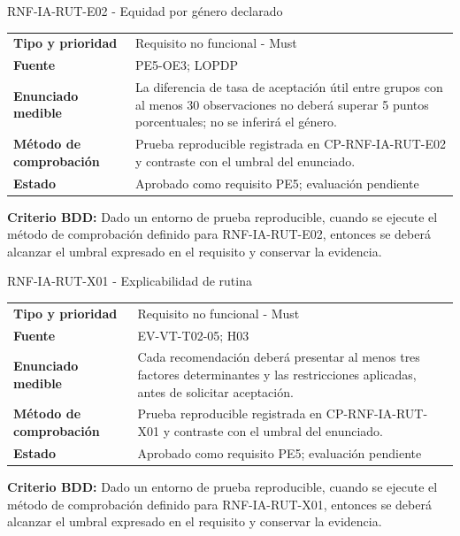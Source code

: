 \documentclass[11pt,a4paper]{article}
\begin{document}
\begin{reqbox}[colframe=Teal]{RNF-IA-RUT-E02 - Equidad por género declarado}
\begin{tabularx}{\textwidth}{>{\bfseries}p{3.2cm}Y}
Tipo y prioridad & Requisito no funcional - Must \\
Fuente & PE5-OE3; LOPDP \\
Enunciado medible & La diferencia de tasa de aceptación útil entre grupos con al menos 30 observaciones no deberá superar 5 puntos porcentuales; no se inferirá el género. \\
Método de comprobación & Prueba reproducible registrada en CP-RNF-IA-RUT-E02 y contraste con el umbral del enunciado. \\
Estado & Aprobado como requisito PE5; evaluación pendiente \\
\end{tabularx}
\textbf{Criterio BDD:} Dado un entorno de prueba reproducible, cuando se ejecute el método de comprobación definido para RNF-IA-RUT-E02, entonces se deberá alcanzar el umbral expresado en el requisito y conservar la evidencia.
\end{reqbox}


\begin{reqbox}[colframe=Teal]{RNF-IA-RUT-X01 - Explicabilidad de rutina}
\begin{tabularx}{\textwidth}{>{\bfseries}p{3.2cm}Y}
Tipo y prioridad & Requisito no funcional - Must \\
Fuente & EV-VT-T02-05; H03 \\
Enunciado medible & Cada recomendación deberá presentar al menos tres factores determinantes y las restricciones aplicadas, antes de solicitar aceptación. \\
Método de comprobación & Prueba reproducible registrada en CP-RNF-IA-RUT-X01 y contraste con el umbral del enunciado. \\
Estado & Aprobado como requisito PE5; evaluación pendiente \\
\end{tabularx}
\textbf{Criterio BDD:} Dado un entorno de prueba reproducible, cuando se ejecute el método de comprobación definido para RNF-IA-RUT-X01, entonces se deberá alcanzar el umbral expresado en el requisito y conservar la evidencia.
\end{reqbox}
\end{document}
